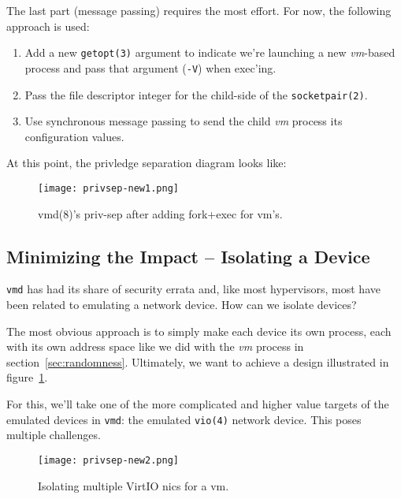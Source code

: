 \documentclass[conference]{IEEEtran}
\begin{document}
The last part (message passing) requires the most effort. For now, the
following approach is used:

\vspace{2mm}
\begin{enumerate}
\item Add a new \texttt{getopt(3)} argument to indicate we're
  launching a new \emph{vm}-based process and pass that argument
  (\texttt{-V}) when exec'ing.
\item Pass the file descriptor integer for the child-side of the
  \texttt{socketpair(2)}.
\item Use synchronous message passing to send the child \emph{vm}
  process its configuration values.
\end{enumerate}
\vspace{2mm}

At this point, the privledge separation diagram looks like:

\begin{figure}
  \texttt{[image: privsep-new1.png]}
  \caption{vmd(8)'s priv-sep after adding fork+exec for vm's.}
\end{figure}


\vspace{3mm}
\subsection{Minimizing the Impact -- Isolating a Device}
\texttt{vmd} has had its share of security errata and, like most
hypervisors, most have been related to emulating a network device. How
can we isolate devices?

The most obvious approach is to simply make each device its own
process, each with its own address space like we did with the
\emph{vm} process in section~\ref{sec:randomness}. Ultimately, we want
to achieve a design illustrated in figure~\ref{fig:new2}.

For this, we'll take one of the more complicated and higher value
targets of the emulated devices in \texttt{vmd}: the emulated
\texttt{vio(4)} network device. This poses multiple challenges.

\vspace{2mm}
\begin{figure}
  \label{fig:new2}
  \texttt{[image: privsep-new2.png]}
  \caption{Isolating multiple VirtIO nics for a vm.}
\end{figure}
\vspace{2mm}
\end{document}
